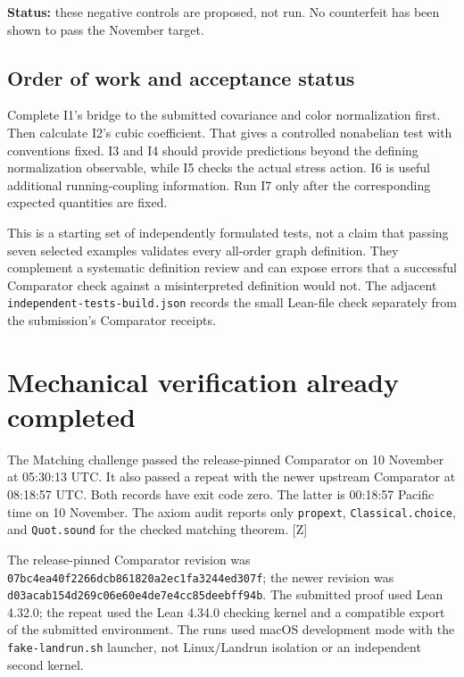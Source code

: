 \documentclass[11pt]{article}
\newcommand{\code}[1]{{\small\nolinkurl{#1}}}
\newcommand{\src}[1]{\textsf{[#1]}}
\begin{document}
\textbf{Status:} these negative controls are proposed, not run.
No counterfeit has been shown to pass the November target.

\subsection{Order of work and acceptance status}

Complete I1's bridge to the submitted covariance and color
normalization first. Then calculate I2's cubic coefficient.
That gives a controlled nonabelian test with conventions fixed.
I3 and I4 should provide predictions beyond the defining
normalization observable, while I5 checks the actual stress
action. I6 is useful additional running-coupling information.
Run I7 only after the corresponding expected quantities are fixed.

This is a starting set of independently formulated tests, not a
claim that passing seven selected examples validates every
all-order graph definition. They complement a systematic
definition review and can expose errors that a successful
Comparator check against a misinterpreted definition would not.
The adjacent \code{independent-tests-build.json} records the
small Lean-file check separately from the submission's
Comparator receipts.


\section{Mechanical verification already completed}
\label{sec:receipts}

The Matching challenge passed the release-pinned Comparator on
10 November at 05:30:13 UTC. It also passed a repeat with the newer
upstream Comparator at 08:18:57 UTC. Both records have exit code zero.
The latter is 00:18:57 Pacific time on 10 November. The axiom audit
reports only \code{propext}, \code{Classical.choice}, and
\code{Quot.sound} for the checked matching theorem. \src{Z}

The release-pinned Comparator revision was
\code{07bc4ea40f2266dcb861820a2ec1fa3244ed307f}; the newer revision was
\code{d03acab154d269c06e60e4de7e4cc85deebff94b}. The submitted proof
used Lean 4.32.0; the repeat used the Lean 4.34.0 checking kernel and
a compatible export of the submitted environment. The runs used
macOS development mode with the \code{fake-landrun.sh} launcher,
not Linux/Landrun isolation or an independent second kernel.
\end{document}
